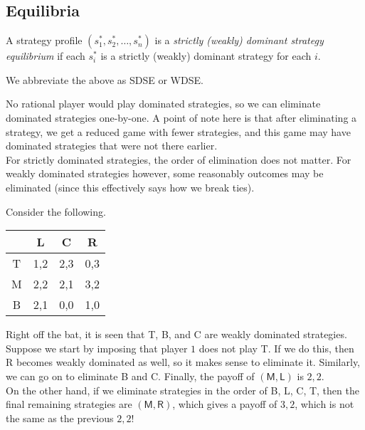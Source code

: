 \subsection{Equilibria}

	\begin{fdef}
		A strategy profile $(s_1^*,s_2^*,\ldots,s_n^*)$ is a \emph{strictly (weakly) dominant strategy equilibrium} if each $s_i^*$ is a strictly (weakly) dominant strategy for each $i$.
	\end{fdef}
	We abbreviate the above as SDSE or WDSE.

	No rational player would play dominated strategies, so we can eliminate dominated strategies one-by-one. A point of note here is that after eliminating a strategy, we get a reduced game with fewer strategies, and this game may have dominated strategies that were not there earlier.\\
	For strictly dominated strategies, the order of elimination does not matter. For weakly dominated strategies however, some reasonably outcomes may be eliminated (since this effectively says how we break ties).

	\begin{fex}
		\label{example: order of eliminating dominated strategies}
		Consider the following.
		\begin{center}
		\begin{tabular}{|c||c|c|c|}
			\hline
			& \textsf{L} & \textsf{C} & \textsf{R} \\
			\hline\hline
			\textsf{T} & 1,2 & 2,3 & 0,3 \\
			\hline
			\textsf{M} & 2,2 & 2,1 & 3,2 \\
			\hline
			\textsf{B} & 2,1 & 0,0 & 1,0 \\ \hline
		\end{tabular}
		\end{center}


		Right off the bat, it is seen that \textsf{T}, \textsf{B}, and \textsf{C} are weakly dominated strategies. Suppose we start by imposing that player $1$ does not play \textsf{T}. If we do this, then \textsf{R} becomes weakly dominated as well, so it makes sense to eliminate it. Similarly, we can go on to eliminate \textsf{B} and \textsf{C}. Finally, the payoff of $(\mathsf{M},\mathsf{L})$ is $2,2$.\\
		On the other hand, if we eliminate strategies in the order of \textsf{B}, \textsf{L}, \textsf{C}, \textsf{T}, then the final remaining strategies are $(\mathsf{M},\mathsf{R})$, which gives a payoff of $3,2$, which is not the same as the previous $2,2$!
	\end{fex}


